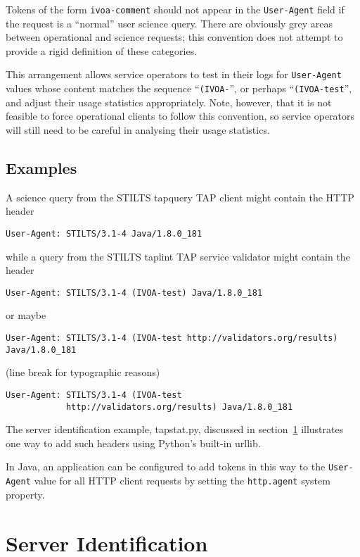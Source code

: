 \documentclass[11pt,a4paper]{ivoa}
\newcommand{\headername}[1]{{\tt #1}}
\begin{document}
Tokens of the form \verb|ivoa-comment| should not appear in the
\headername{User-Agent} field
if the request is a ``normal'' user science query. There
are obviously grey areas between operational and science requests; this
convention does not attempt to provide a rigid definition of these
categories.

This arrangement allows service operators to test in their logs for
\headername{User-Agent} values
whose content matches the sequence ``\verb|(IVOA-|'', or
perhaps ``\verb|(IVOA-test|'', and adjust their usage statistics
appropriately. Note, however, that it is not feasible to force operational
clients to follow this convention, so service operators will still need
to be careful in analysing their usage statistics.

\subsection{Examples}

A science query from the STILTS tapquery TAP client might contain the
HTTP header
\begin{verbatim}
User-Agent: STILTS/3.1-4 Java/1.8.0_181
\end{verbatim}
while a query from the STILTS taplint TAP service validator might
contain the header
\begin{verbatim}
User-Agent: STILTS/3.1-4 (IVOA-test) Java/1.8.0_181
\end{verbatim}
or maybe 
\iftth
\begin{verbatim}
User-Agent: STILTS/3.1-4 (IVOA-test http://validators.org/results) Java/1.8.0_181
\end{verbatim}
\else
(line break for typographic reasons)
\begin{verbatim}
User-Agent: STILTS/3.1-4 (IVOA-test
            http://validators.org/results) Java/1.8.0_181
\end{verbatim}
\fi

The server identification example, tapstat.py, discussed in
section~\ref{sect:server} illustrates one way to add such headers using
Python's built-in urllib.

In Java, an application can be configured to add tokens in this way
to the \headername{User-Agent} value for all HTTP client requests
by setting the {\tt http.agent} system property.


\section{Server Identification}
\label{sect:server}
\end{document}
